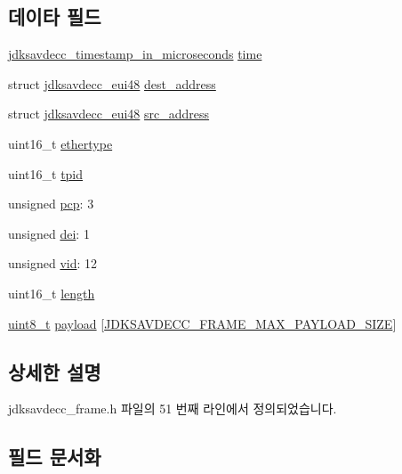\subsection*{데이타 필드}
\begin{DoxyCompactItemize}
\item 
\hyperlink{group__util_gaca5142930a1fb7fba0d88a9c2d16a848}{jdksavdecc\+\_\+timestamp\+\_\+in\+\_\+microseconds} \hyperlink{structjdksavdecc__frame_adb3aaacbdb2a17782b3b1a077e98b7ef}{time}
\item 
struct \hyperlink{structjdksavdecc__eui48}{jdksavdecc\+\_\+eui48} \hyperlink{structjdksavdecc__frame_a104d37031c593f66765dc66d8ac8962b}{dest\+\_\+address}
\item 
struct \hyperlink{structjdksavdecc__eui48}{jdksavdecc\+\_\+eui48} \hyperlink{structjdksavdecc__frame_a74855d22d112da72f29ba4959ebc639b}{src\+\_\+address}
\item 
uint16\+\_\+t \hyperlink{structjdksavdecc__frame_aa9296c58dc24c63c4ee927db394a97d7}{ethertype}
\item 
uint16\+\_\+t \hyperlink{structjdksavdecc__frame_a6732d2a618d68a2a54a3be2712852ee9}{tpid}
\item 
unsigned \hyperlink{structjdksavdecc__frame_a7f33a59d77ba03f3fc3cefd0d2f4f434}{pcp}\+: 3
\item 
unsigned \hyperlink{structjdksavdecc__frame_a160cefca2111b7985c1ad181297c0a90}{dei}\+: 1
\item 
unsigned \hyperlink{structjdksavdecc__frame_a139f10af6306ba74259c24567d70c42d}{vid}\+: 12
\item 
uint16\+\_\+t \hyperlink{structjdksavdecc__frame_a1892eba2086d12ac2b09005aeb09ea3b}{length}
\item 
\hyperlink{stdint_8h_aba7bc1797add20fe3efdf37ced1182c5}{uint8\+\_\+t} \hyperlink{structjdksavdecc__frame_a220ad076814a31ae0163e722e523de46}{payload} \mbox{[}\hyperlink{group__frame_ga93cd53c237fa828f2d5045299571e4fe}{J\+D\+K\+S\+A\+V\+D\+E\+C\+C\+\_\+\+F\+R\+A\+M\+E\+\_\+\+M\+A\+X\+\_\+\+P\+A\+Y\+L\+O\+A\+D\+\_\+\+S\+I\+ZE}\mbox{]}
\end{DoxyCompactItemize}


\subsection{상세한 설명}


jdksavdecc\+\_\+frame.\+h 파일의 51 번째 라인에서 정의되었습니다.



\subsection{필드 문서화}
